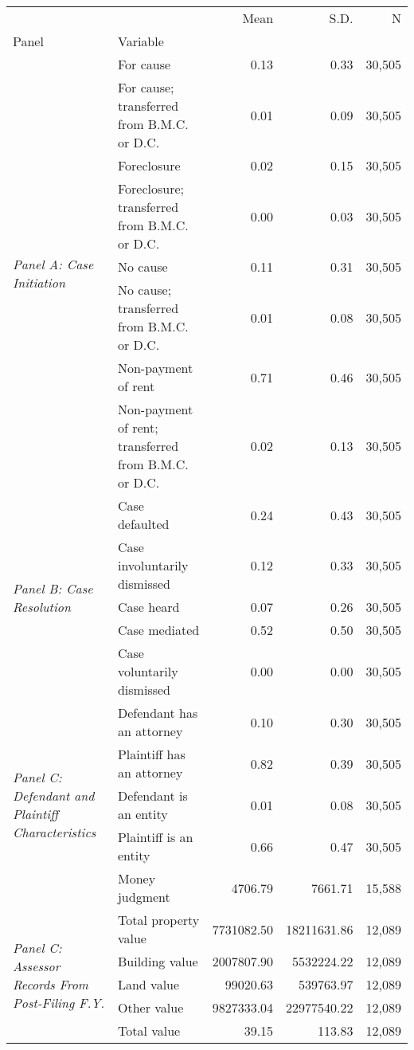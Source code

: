 \begin{tabular}{llrrr}
\toprule
 &  & Mean & S.D. & N \\
Panel & Variable &  &  &  \\
\midrule
\multirow[c]{8}{*}{\textit{Panel A: Case Initiation}} & For cause & 0.13 & 0.33 & 30,505 \\
 & For cause; transferred from B.M.C. or D.C. & 0.01 & 0.09 & 30,505 \\
 & Foreclosure & 0.02 & 0.15 & 30,505 \\
 & Foreclosure; transferred from B.M.C. or D.C. & 0.00 & 0.03 & 30,505 \\
 & No cause & 0.11 & 0.31 & 30,505 \\
 & No cause; transferred from B.M.C. or D.C. & 0.01 & 0.08 & 30,505 \\
 & Non-payment of rent & 0.71 & 0.46 & 30,505 \\
 & Non-payment of rent; transferred from B.M.C. or D.C. & 0.02 & 0.13 & 30,505 \\
\cline{1-5}
\multirow[c]{5}{*}{\textit{Panel B: Case Resolution}} & Case defaulted & 0.24 & 0.43 & 30,505 \\
 & Case involuntarily dismissed & 0.12 & 0.33 & 30,505 \\
 & Case heard & 0.07 & 0.26 & 30,505 \\
 & Case mediated & 0.52 & 0.50 & 30,505 \\
 & Case voluntarily dismissed & 0.00 & 0.00 & 30,505 \\
\cline{1-5}
\multirow[c]{5}{*}{\textit{Panel C: Defendant and Plaintiff Characteristics}} & Defendant has an attorney & 0.10 & 0.30 & 30,505 \\
 & Plaintiff has an attorney & 0.82 & 0.39 & 30,505 \\
 & Defendant is an entity & 0.01 & 0.08 & 30,505 \\
 & Plaintiff is an entity & 0.66 & 0.47 & 30,505 \\
 & Money judgment & 4706.79 & 7661.71 & 15,588 \\
\cline{1-5}
\multirow[c]{5}{*}{\textit{Panel C: Assessor Records From Post-Filing F.Y.}} & Total property value & 7731082.50 & 18211631.86 & 12,089 \\
 & Building value & 2007807.90 & 5532224.22 & 12,089 \\
 & Land value & 99020.63 & 539763.97 & 12,089 \\
 & Other value & 9827333.04 & 22977540.22 & 12,089 \\
 & Total value & 39.15 & 113.83 & 12,089 \\

\end{tabular}
